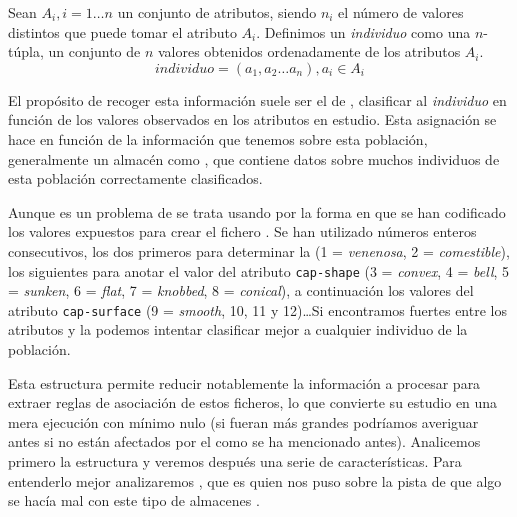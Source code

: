 \ABIERTO


\begin{Definition}[Individuo]
   Sean $A_i, i = 1 \ldots n$ un conjunto de atributos, siendo $n_i$ el número de valores distintos que puede tomar el atributo $A_i$. Definimos un \emph{individuo} como una $n$-túpla, un conjunto de $n$ valores obtenidos ordenadamente de los atributos $A_i$.
   $$individuo = \left(a_1, a_2\ldots a_n\right), a_i \in A_i$$
\label{def:individuo}
\end{Definition}

El propósito de recoger esta información suele ser el de \clasificacion, clasificar al \emph{individuo} en función de los valores observados en los atributos en estudio. Esta asignación se hace en función de la información que tenemos sobre esta población, generalmente un almacén \D como \mushroom, que contiene datos sobre muchos individuos de esta población correctamente clasificados.

Aunque es un problema de \Clasificacion se trata usando \arm por la forma en que se han codificado los valores expuestos para crear el fichero \mushroom. Se han utilizado números enteros consecutivos, los dos primeros para determinar la \clase (1 = \emph{venenosa}, 2 = \emph{comestible}), los siguientes para anotar el valor del atributo \texttt{cap-shape} (3 = \emph{convex}, 4 = \emph{bell}, 5 = \emph{sunken}, 6 = \emph{flat}, 7 = \emph{knobbed}, 8 = \emph{conical}), a continuación los valores del atributo \texttt{cap-surface} (9 = \emph{smooth}, 10, 11 y 12)\ldots Si encontramos \ARs fuertes entre los atributos y la \clase podemos intentar clasificar mejor a cualquier individuo de la población.







Esta estructura permite reducir notablemente la información a procesar para extraer reglas de asociación de estos ficheros, lo que convierte su estudio en una mera ejecución con \soporte mínimo nulo (si fueran más grandes podríamos averiguar antes si no están afectados por el \dilemaIR como se ha mencionado antes). Analicemos primero la estructura y veremos después una serie de características. Para entenderlo mejor analizaremos \mushroom, que es quien nos puso sobre la pista de que algo se hacía mal con este tipo de almacenes \D.

